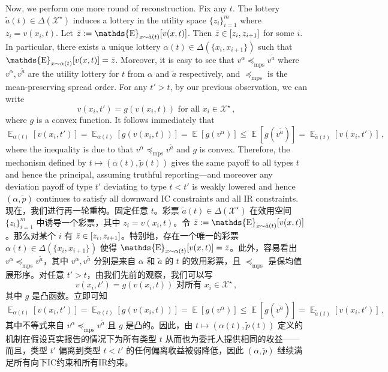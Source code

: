 \documentclass[12pt,letterpaper]{article}
\newenvironment{original}{\color{black}\noindent}{}
\newenvironment{translation}{\color{blue}\noindent}{}
\theoremstyle{plain}
\theoremstyle{definition}
\theoremstyle{remark}
\DeclareMathOperator{\E}{\mathds{E}}
\renewcommand{\1}{\mathds{1}}
\newcommand{\X}{\mathcal{X}}
\theoremstyle{definition}
\begin{document}
\begin{original}
Now, we perform one more round of reconstruction. Fix any $t$. The lottery $\tilde{a}(t) \in \Delta(\X^\star)$ induces a lottery in the utility space $\{z_i\}_{i=1}^m$ where $z_i = v(x_i, t)$. Let $\Bar{z} := \E_{x \sim \tilde{a}(t)}[v(x, t)]$. Then $\Bar{z} \in [z_i, z_{i+1}]$ for some $i$. In particular, there exists a unique lottery $\alpha(t) \in \Delta(\{x_i, x_{i+1}\})$ such that $\E_{x \sim \alpha(t)}[v(x, t)] = \Bar{z}$. Moreover, it is easy to see that $v^{\alpha} \preceq_{\text{mps}} v^{\tilde{a}}$ where $v^{\alpha}, v^{\tilde{a}}$ are the utility lottery for $t$ from $\alpha$ and $\tilde{a}$ respectively, and $\preceq_{\text{mps}}$ is the mean-preserving spread order. For any $t' > t$, by our previous observation, we can write
\[v(x_i, t') = g(v(x_i, t)) \text{ for all $x_i \in \X^\star$}\,,\]
where $g$ is a convex function. It follows immediately that
\[\E_{\alpha(t)}[v(x_i, t')] = \E_{\alpha(t)}[g(v(x_i, t))] = \E[g(v^\alpha)] \leq \E[g(v^{\tilde{a}})] = \E_{\tilde{a}(t)}[v(x_i, t')]\,, \]
where the inequality is due to that $v^{\alpha} \preceq_{\text{mps}} v^{\tilde{a}}$ and $g$ is convex. Therefore, the mechanism defined by $t \mapsto (\alpha(t), \tilde{p}(t))$ gives the same payoff to all types $t$ and hence the principal, assuming truthful reporting---and moreover any deviation payoff of type $t'$ deviating to type $t < t'$ is weakly lowered and hence $(\alpha, \tilde{p})$ continues to satisfy all downward IC constraints and all IR constraints.
\end{original}
\begin{translation}
现在，我们进行再一轮重构。固定任意 $t$。彩票 $\tilde{a}(t) \in \Delta(\X^\star)$ 在效用空间 $\{z_i\}_{i=1}^m$ 中诱导一个彩票，其中 $z_i = v(x_i, t)$。令 $\Bar{z} := \E_{x \sim \tilde{a}(t)}[v(x, t)]$。那么对某个 $i$ 有 $\Bar{z} \in [z_i, z_{i+1}]$。特别地，存在一个唯一的彩票 $\alpha(t) \in \Delta(\{x_i, x_{i+1}\})$ 使得 $\E_{x \sim \alpha(t)}[v(x, t)] = \Bar{z}$。此外，容易看出 $v^{\alpha} \preceq_{\text{mps}} v^{\tilde{a}}$，其中 $v^{\alpha}, v^{\tilde{a}}$ 分别是来自 $\alpha$ 和 $\tilde{a}$ 的 $t$ 的效用彩票，且 $\preceq_{\text{mps}}$ 是保均值展形序。对任意 $t' > t$，由我们先前的观察，我们可以写
\[v(x_i, t') = g(v(x_i, t)) \text{ 对所有 $x_i \in \X^\star$}\,,\]
其中 $g$ 是凸函数。立即可知
\[\E_{\alpha(t)}[v(x_i, t')] = \E_{\alpha(t)}[g(v(x_i, t))] = \E[g(v^\alpha)] \leq \E[g(v^{\tilde{a}})] = \E_{\tilde{a}(t)}[v(x_i, t')]\,, \]
其中不等式来自 $v^{\alpha} \preceq_{\text{mps}} v^{\tilde{a}}$ 且 $g$ 是凸的。因此，由 $t \mapsto (\alpha(t), \tilde{p}(t))$ 定义的机制在假设真实报告的情况下为所有类型 $t$ 从而也为委托人提供相同的收益——而且，类型 $t'$ 偏离到类型 $t < t'$ 的任何偏离收益被弱降低，因此 $(\alpha, \tilde{p})$ 继续满足所有向下IC约束和所有IR约束。
\end{translation}
\end{document}

